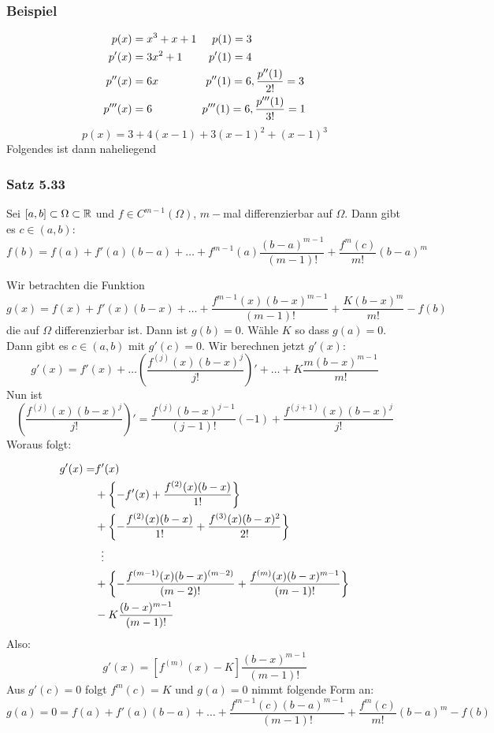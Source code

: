 \subsubsection*{Beispiel}
\begin{align*}
p(x)&=x^3+x+1 \hspace{5mm}p(1)=3\\
p'(x)&=3x^2+1\hspace{8.5mm} p'(1)=4\\
p''(x)&=6x \hspace{15.2mm} p''(1)=6, \frac{p''(1)}{2!}=3\\
p'''(x)&=6 \hspace{16mm} p'''(1)=6, \frac{p'''(1)}{3!}=1\\
\end{align*}
\[p(x)=3+4(x-1)+3(x-1)^2+(x-1)^3\]
Folgendes ist dann naheliegend

\subsubsection*{Satz 5.33}
Sei $\lbrack a,b\rbrack\subset \Omega\subset\mathbb{R}$ und $f\in C^{m-1}\left( \Omega\right)$, $m-$mal differenzierbar auf $\Omega$. Dann gibt es $c\in(a,b)$:
\[f(b)=f(a)+f'(a)(b-a)+\dots+f^{m-1}(a)\frac{(b-a)^{m-1}}{(m-1)!}+\frac{f^m(c)}{m!}(b-a)^m\]

\begin{beweis}{}
Wir betrachten die Funktion
\[g(x)=f(x)+f'(x)(b-x)+\dots+\frac{f^{m-1}(x)(b-x)^{m-1}}{(m-1)!}+\frac{K(b-x)^m}{m!}-f(b)\]
die auf $\Omega$ differenzierbar ist. Dann ist $g(b)=0$. Wähle $K$ so dass $g(a)=0$. Dann gibt es $c\in (a,b)$ mit $g'(c)=0$. Wir berechnen jetzt $g'(x)$:
\[g'(x)=f'(x)+\dots \left( \frac{f^{(j)}(x)(b-x)^j}{j!}\right)'+\dots+K\frac{m(b-x)^{m-1}}{m!}\]
Nun ist
\[\left( \frac{f^{(j)}(x)(b-x)^j}{j!}\right)'=\frac{f^{(j)}(b-x)^{j-1}}{(j-1)!}(-1)+\frac{f^{(j+1)}(x)(b-x)^{j}}{j!}\]
Woraus folgt:

\begin{align*}
g'(x)=&f'(x)\\
&+\left\{ -f'(x)+\frac{f^{(2)}{(x)(b-x)}}{1!}\right\}\\
&+\left\{ -\frac{f^{(2)}(x)(b-x)}{1!}+ \frac{f^{(3)}(x)(b-x)^2}{2!} \right\}\\
&\hspace{2mm}\vdots\\
&+\left\{ -\frac{f^{(m-1)}(x)(b-x)^{(m-2)}}{(m-2)!}+ \frac{f^{(m)}(x)(b-x)^{m-1}}{(m-1)!} \right\}\\
&-K\frac{(b-x)^{m-1}}{(m-1)!}
\end{align*}
Also: \[g'(x)=\left[ f^{(m)}(x)-K\right]\frac{(b-x)^{m-1}}{(m-1)!}\]
Aus $g'(c)=0$ folgt $\boxed{f^m(c)=K}$ und $g(a)=0$ nimmt folgende Form an:
\[g(a)=0=f(a)+f'(a)(b-a)+\dots+\frac{f^{m-1}(c)(b-a)^{m-1}}{(m-1)!}+\frac{f^m(c)}{m!}(b-a)^m-f(b)\]
\end{beweis}


